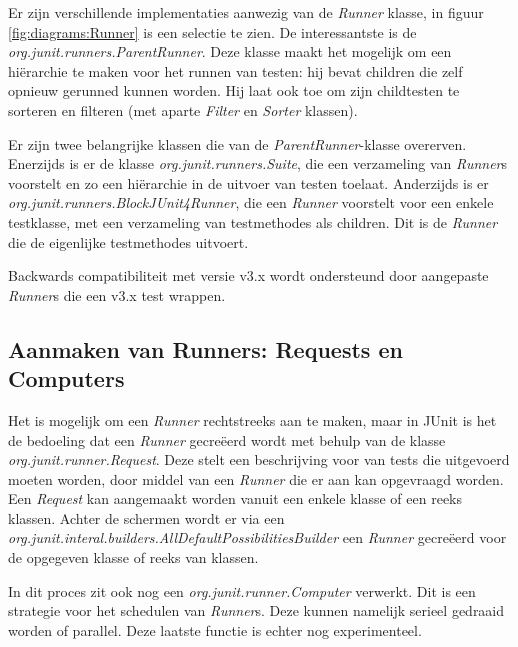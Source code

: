 \documentclass[i1]{oss}
\begin{document}
Er zijn verschillende implementaties aanwezig van de \emph{Runner} klasse, in figuur \ref{fig:diagrams:Runner} is een selectie te zien. De interessantste is de \emph{org.junit.runners.ParentRunner}. Deze klasse maakt het mogelijk om een hi\"erarchie te maken voor het runnen van testen: hij bevat children die zelf opnieuw gerunned kunnen worden. Hij laat ook toe om zijn childtesten te sorteren en filteren (met aparte \emph{Filter} en \emph{Sorter} klassen).
%

Er zijn twee belangrijke klassen die van de \emph{ParentRunner}-klasse overerven. Enerzijds is er de klasse \emph{org.junit.runners.Suite}, die een verzameling van \emph{Runner}s voorstelt en zo een hi\"erarchie in de uitvoer van testen toelaat. Anderzijds is er \emph{org.junit.runners.BlockJUnit4Runner}, die een \emph{Runner} voorstelt voor een enkele testklasse, met een verzameling van testmethodes als children. Dit is de \emph{Runner} die de eigenlijke testmethodes uitvoert.

Backwards compatibiliteit met versie v3.x wordt ondersteund door aangepaste \emph{Runner}s die een v3.x test wrappen.

\subsection{Aanmaken van Runners: Requests en Computers}

Het is mogelijk om een \emph{Runner} rechtstreeks aan te maken, maar in JUnit is het de bedoeling dat een \emph{Runner} gecre\"eerd wordt met behulp van de klasse \emph{org.junit.runner.Request}. Deze stelt een beschrijving voor van tests die uitgevoerd moeten worden, door middel van een \emph{Runner} die er aan kan opgevraagd worden. Een \emph{Request} kan aangemaakt worden vanuit een enkele klasse of een reeks klassen. Achter de schermen wordt er via een \emph{org.junit.interal.builders.AllDefaultPossibilitiesBuilder} een \emph{Runner} gecre\"eerd voor de opgegeven klasse of reeks van klassen.

In dit proces zit ook nog een \emph{org.junit.runner.Computer} verwerkt. Dit is een strategie voor het schedulen van \emph{Runner}s. Deze kunnen namelijk serieel gedraaid worden of parallel. Deze laatste functie is echter nog experimenteel.
\end{document}
